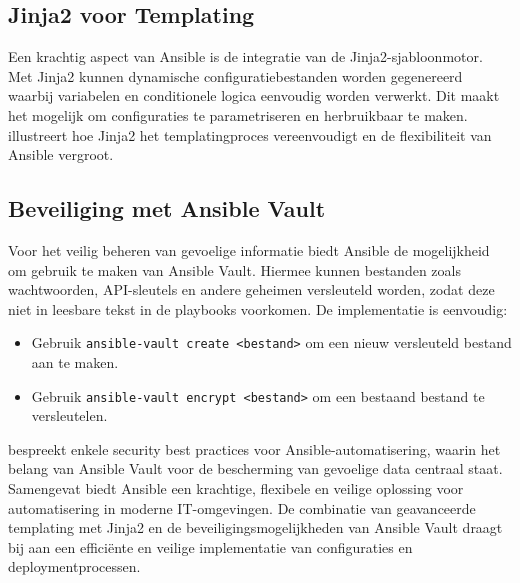   \subsection*{Jinja2 voor Templating}
  Een krachtig aspect van Ansible is de integratie van de Jinja2-sjabloonmotor. 
  Met Jinja2 kunnen dynamische configuratiebestanden worden gegenereerd waarbij variabelen en conditionele logica eenvoudig worden verwerkt. 
  Dit maakt het mogelijk om configuraties te parametriseren en herbruikbaar te maken. 
  \textcite{Moustakis2023} illustreert hoe Jinja2 het templatingproces vereenvoudigt en de flexibiliteit van Ansible vergroot.
  
  \subsection*{Beveiliging met Ansible Vault}
  Voor het veilig beheren van gevoelige informatie biedt Ansible de mogelijkheid om gebruik te maken van Ansible Vault. 
  Hiermee kunnen bestanden zoals wachtwoorden, API-sleutels en andere geheimen versleuteld worden, zodat deze niet in leesbare tekst in de playbooks voorkomen. 
  De implementatie is eenvoudig:
  \begin{itemize}
      \item Gebruik \texttt{ansible-vault create <bestand>} om een nieuw versleuteld bestand aan te maken.
      \item Gebruik \texttt{ansible-vault encrypt <bestand>} om een bestaand bestand te versleutelen.
  \end{itemize}
  \textcite{Samatkar2023} bespreekt enkele security best practices voor Ansible-automatisering, waarin het belang van Ansible Vault voor de bescherming van gevoelige data centraal staat.\\
  
  \noindent Samengevat biedt Ansible een krachtige, flexibele en veilige oplossing voor automatisering in moderne IT-omgevingen. 
  De combinatie van geavanceerde templating met Jinja2 en de beveiligingsmogelijkheden van Ansible Vault draagt bij aan een efficiënte en veilige implementatie van configuraties en deploymentprocessen.
  